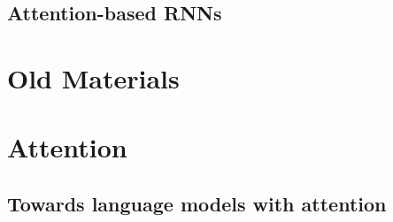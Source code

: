         
        


\pagebreak


\iffalse


    \phantom{}


        


    \subsection{Attention-based RNNs}


        



\section{Old Materials}

\section{Attention}
\label{sec:attention}

%


\subsection{Towards language models with attention}


